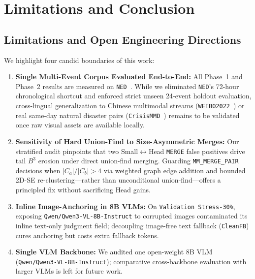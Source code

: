 \section{Limitations and Conclusion}
\label{sec:conclusion}

\subsection{Limitations and Open Engineering Directions}
We highlight four candid boundaries of this work:
\begin{enumerate}
    \item \textbf{Single Multi-Event Corpus Evaluated End-to-End:} All Phase~1 and Phase~2 results are measured on \texttt{NED}~\cite{lin2024ned}. While we eliminated \texttt{NED}'s 72-hour chronological shortcut and enforced strict unseen 24-event holdout evaluation, cross-lingual generalization to Chinese multimodal streams (\texttt{WEIBO2022}~\cite{han2026kqgnn}) or real same-day natural disaster pairs (\texttt{CrisisMMD}~\cite{alam2018crisismmd}) remains to be validated once raw visual assets are available locally.
    \item \textbf{Sensitivity of Hard Union-Find to Size-Asymmetric Merges:} Our stratified audit pinpoints that two Small$\leftrightarrow$Head \texttt{MERGE} false positives drive tail $B^3$ erosion under direct union-find merging. Guarding \texttt{MM\_MERGE\_PAIR} decisions when $|C_a| / |C_b| > 4$ via weighted graph edge addition and bounded 2D-SE re-clustering---rather than unconditional union-find---offers a principled fix without sacrificing Head gains.
    \item \textbf{Inline Image-Anchoring in 8B VLMs:} On \texttt{Validation Stress-30\%}, exposing \texttt{Qwen/Qwen3-VL-8B-Instruct} to corrupted images contaminated its inline text-only judgment field; decoupling image-free text fallback (\texttt{CleanFB}) cures anchoring but costs extra fallback tokens.
    \item \textbf{Single VLM Backbone:} We audited one open-weight 8B VLM (\texttt{Qwen/Qwen3-VL-8B-Instruct}); comparative cross-backbone evaluation with larger VLMs is left for future work.
\end{enumerate}

